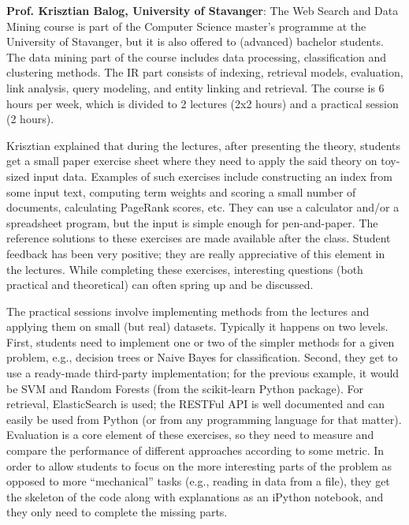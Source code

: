 {\bf Prof. Krisztian Balog, University of Stavanger}:
The Web Search and Data Mining course is part of the Computer Science master's programme at the University of Stavanger, but it is also offered to (advanced) bachelor students.
The data mining part of the course includes data processing, classification and clustering methods.  The IR part consists of indexing, retrieval models, evaluation, link analysis, query modeling, and entity linking and retrieval.
The course is 6 hours per week, which is divided to 2 lectures (2x2 hours) and a practical session (2 hours).  

Krisztian explained that during the lectures, after presenting the theory, students get a small paper exercise sheet where they need to apply the said theory on toy-sized input data.  Examples of such exercises include constructing an index from some input text, computing term weights and scoring a small number of documents, calculating PageRank scores, etc.  They can use a calculator and/or a spreadsheet program, but the input is simple enough for pen-and-paper. The reference solutions to these exercises are made available after the class.  Student feedback has been very positive; they are really appreciative of this element in the lectures. While completing these exercises, interesting questions (both practical and theoretical) can often spring up and be discussed.
 
The practical sessions involve implementing methods from the lectures and applying them on small (but real) datasets.  Typically it happens on two levels.  First, students need to implement one or two of the simpler methods for a given problem, e.g., decision trees or Naive Bayes for classification. Second, they get to use a ready-made third-party implementation; for the previous example, it would be SVM and Random Forests (from the scikit-learn Python package). For retrieval, ElasticSearch is used; the RESTFul API is well documented and can easily be used from Python (or from any programming language for that matter).  Evaluation is a core element of these exercises, so they need to measure and compare the performance of different approaches according to some metric. 
In order to allow students to focus on the more interesting parts of the problem as opposed to more ``mechanical'' tasks (e.g., reading in data from a file), they get the skeleton of the code along with explanations as an iPython notebook, and they only need to complete the missing parts.

